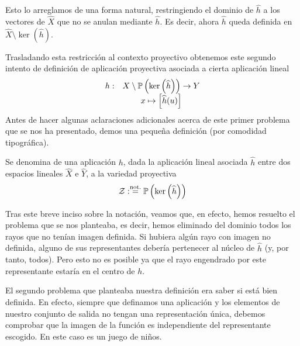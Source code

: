 Esto lo arreglamos de una forma natural, restringiendo el dominio de $\widehat{h}$ a los vectores de $\widehat{X}$ que no se anulan mediante $\widehat{h}$. Es decir, ahora $\widehat{h}$ queda definida en $\widehat{X}\setminus \ker\left(\widehat{h}\right)$.

Trasladando esta restricción al contexto proyectivo obtenemos este segundo intento de definición de aplicación proyectiva asociada a cierta aplicación lineal
\begin{equation*}
	\begin{array}{cc}
	h:&X\setminus\mathbb{P}\left(\ker\left(\widehat{h}\right)\right)\to Y\\
	&x\mapsto\left [ \widehat{h}(u) \right ]
	\end{array}
\end{equation*}
Antes de hacer algunas aclaraciones adicionales acerca de este primer problema que se nos ha presentado, demos una pequeña definición (por comodidad tipográfica).
\begin{defi}[Centro]
	\label{apro_def_centro}
	Se denomina  de una aplicación $h$, dada la aplicación lineal asociada $\widehat{h}$ entre dos espacios lineales $\widehat{X}$ e $\widehat{Y}$, a la variedad proyectiva
	\begin{equation*}
		\mathcal{Z}:\stackrel{\textrm{not.}}{=}\mathbb{P}\left(\ker\left(\widehat{h}\right)\right)
	\end{equation*}
\end{defi}
Tras este breve inciso sobre la notación, veamos que, en efecto, hemos resuelto el problema que se nos planteaba, es decir, hemos eliminado del dominio todos los rayos que no tenían imagen definida. Si hubiera algún rayo con imagen no definida, alguno de sus representantes debería pertenecer al núcleo de $\widehat{h}$ (y, por tanto, todos). Pero esto no es posible ya que el rayo engendrado por este representante estaría en el centro de $h$.

El segundo problema que planteaba nuestra definición era saber si está bien definida. En efecto, siempre que definamos una aplicación y los elementos de nuestro conjunto de salida no tengan una representación única, debemos comprobar que la imagen de la función es independiente del representante escogido. En este caso es un juego de niños.

